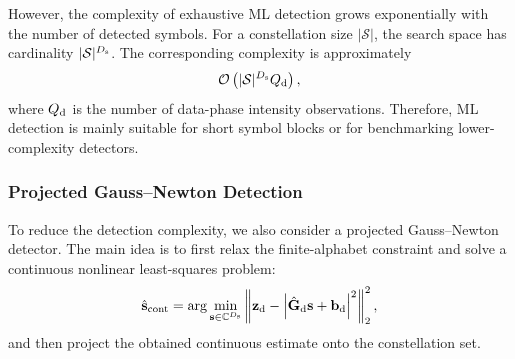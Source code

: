 \documentclass[journal]{IEEEtran}
\begin{document}
However, the complexity of exhaustive ML detection grows exponentially with the number of detected symbols. 
For a constellation size $|\mathcal{S}|$, the search space has cardinality $|\mathcal{S}|^{D_{\rm s}}$. 
The corresponding complexity is approximately
\begin{equation}
\mathcal{O}
\left(
|\mathcal{S}|^{D_{\rm s}}Q_{\rm d}
\right),
\label{eq:ml_detection_complexity}
\end{equation}
where $Q_{\rm d}$ is the number of data-phase intensity observations. 
Therefore, ML detection is mainly suitable for short symbol blocks or for benchmarking lower-complexity detectors.

\subsubsection{Projected Gauss--Newton Detection}

To reduce the detection complexity, we also consider a projected Gauss--Newton detector. 
The main idea is to first relax the finite-alphabet constraint and solve a continuous nonlinear least-squares problem:
\begin{equation}
\hat{\mathbf{s}}_{\rm cont}
=
\arg\min_{\mathbf{s}\in\mathbb{C}^{D_{\rm s}}}
\left\|
\mathbf{z}_{\rm d}
-
\left|
\hat{\mathbf{G}}_{\rm d}\mathbf{s}
+
\mathbf{b}_{\rm d}
\right|^2
\right\|_2^2,
\label{eq:continuous_symbol_relaxation}
\end{equation}
and then project the obtained continuous estimate onto the constellation set.
\end{document}

